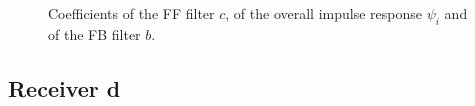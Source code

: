 \documentclass[a4paper, 12pt]{report}
\begin{document}
\begin{figure}[H]
	\centering
	\quad
	\caption{Coefficients of the FF filter $c$, of the overall impulse response $\psi_i$ and of the FB filter $b$.}\label{rec_c}
\end{figure}


\clearpage
\subsection*{Receiver d}
\end{document}
